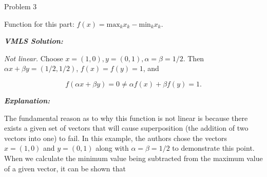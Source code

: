 \begin{problem}{Problem 3}
\begin{Highlight}
        Function for this part: $f(x) = \text{max}_{k}x_{k} - \text{min}_{k}x_{k}$. \vspace*{1em}

        \textbf{\textit{VMLS Solution:}} \vspace*{1em}

        \textit{Not linear.} Choose $x = (1,0), y = (0,1), \alpha = \beta = 1/2$. Then $\alpha x + \beta y = (1/2,1/2)$, $f(x) = f(y) = 1$, and
        
        \setcounter{equation}{0}
        \begin{equation}
            f(\alpha x + \beta y) = 0 \neq \alpha f(x) + \beta f(y) = 1.
        \end{equation}

        \textbf{\textit{Explanation:}} \vspace*{1em}

        The fundamental reason as to why this function is not linear is because there exists a given set of vectors that will cause superposition (the addition of two vectors into one) to fail. In this
        example, the authors chose the vectors $x = (1,0)$ and $y = (0,1)$ along with $\alpha = \beta = 1/2$ to demonstrate this point. When we calculate the minimum value being subtracted from the maximum
        value of a given vector, it can be shown that 


\end{Highlight}
\end{problem}
